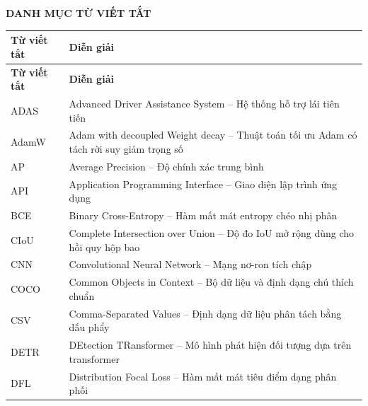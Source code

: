 \newpage
\thispagestyle{plain}

\begin{center}
    {\bfseries\Large DANH MỤC TỪ VIẾT TẮT}
\end{center}

\vspace{0.8cm}

\renewcommand{\arraystretch}{1.25}

\begin{longtable}{>{\centering\arraybackslash}p{3.2cm} p{10.5cm}}
    \toprule
    \textbf{Từ viết tắt} & \textbf{Diễn giải} \\
    \midrule
    \endfirsthead

    \toprule
    \textbf{Từ viết tắt} & \textbf{Diễn giải} \\
    \midrule
    \endhead

    ADAS & Advanced Driver Assistance System -- Hệ thống hỗ trợ lái tiên tiến \\

    AdamW & Adam with decoupled Weight decay -- Thuật toán tối ưu Adam có tách rời suy giảm trọng số \\

    AP & Average Precision -- Độ chính xác trung bình \\

    API & Application Programming Interface -- Giao diện lập trình ứng dụng \\

    BCE & Binary Cross-Entropy -- Hàm mất mát entropy chéo nhị phân \\

    CIoU & Complete Intersection over Union -- Độ đo IoU mở rộng dùng cho hồi quy hộp bao \\

    CNN & Convolutional Neural Network -- Mạng nơ-ron tích chập \\

    COCO & Common Objects in Context -- Bộ dữ liệu và định dạng chú thích chuẩn \\

    CSV & Comma-Separated Values -- Định dạng dữ liệu phân tách bằng dấu phẩy \\

    DETR & DEtection TRansformer -- Mô hình phát hiện đối tượng dựa trên transformer \\

    DFL & Distribution Focal Loss -- Hàm mất mát tiêu điểm dạng phân phối \\


\end{longtable}
